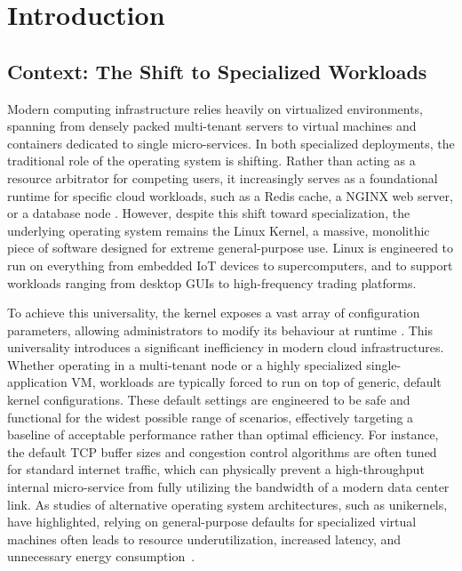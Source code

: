 \chapter{Introduction}
\label{ch:introduction}

\section{Context: The Shift to Specialized Workloads}

Modern computing infrastructure relies heavily on virtualized environments, spanning from densely packed multi-tenant servers to virtual machines and containers dedicated to single micro-services.
In both specialized deployments, the traditional role of the operating system is shifting.
Rather than acting as a resource arbitrator for competing users, it increasingly serves as a foundational runtime for specific cloud workloads, such as a Redis cache, a NGINX web server, or a database node \cite{shift_to_microservices}. However, despite this shift toward specialization, the underlying operating system remains the Linux Kernel, a massive, monolithic piece of software designed for extreme general-purpose use.
Linux is engineered to run on everything from embedded IoT devices to supercomputers, and to support workloads ranging from desktop GUIs to high-frequency trading platforms.

To achieve this universality, the kernel exposes a vast array of configuration parameters, allowing administrators to modify its behaviour at runtime \cite{kernel_parameters}. This universality introduces a significant inefficiency in modern cloud infrastructures.
Whether operating in a multi-tenant node or a highly specialized single-application VM, workloads are typically forced to run on top of generic, default kernel configurations.
These default settings are engineered to be safe and functional for the widest possible range of scenarios, effectively targeting a baseline of acceptable performance rather than optimal efficiency.
For instance, the default TCP buffer sizes and congestion control algorithms are often tuned for standard internet traffic, which can physically prevent a high-throughput internal micro-service from fully utilizing the bandwidth of a modern data center link.
As studies of alternative operating system architectures, such as unikernels, have highlighted, relying on general-purpose defaults for specialized virtual machines often leads to resource underutilization, increased latency, and unnecessary energy consumption~\cite{unikernels}.

